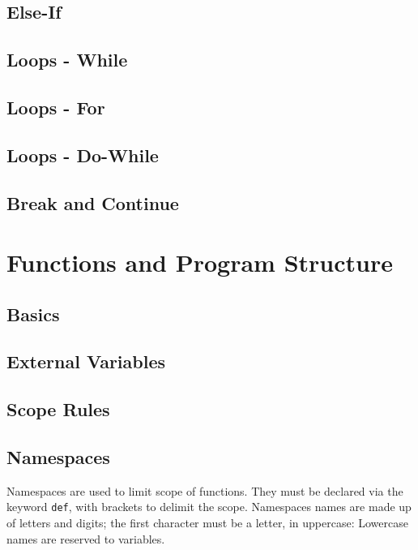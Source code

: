 \documentclass{scrartcl}
\begin{document}
        \subsection{Else-If}
        \subsection{Loops - While}
        \subsection{Loops - For}
        \subsection{Loops - Do-While}
        \subsection{Break and Continue}
    \section{Functions and Program Structure}
        \subsection{Basics}
        \subsection{External Variables}
        \subsection{Scope Rules}
        \subsection{Namespaces} \label{namespaces}
            Namespaces are used to limit scope of functions. They must be declared
            via the keyword \texttt{def}, with brackets to delimit the scope.
            Namespaces names are made up of letters and digits; the first character
            must be a letter, in uppercase: Lowercase names are reserved to variables.
\end{document}
